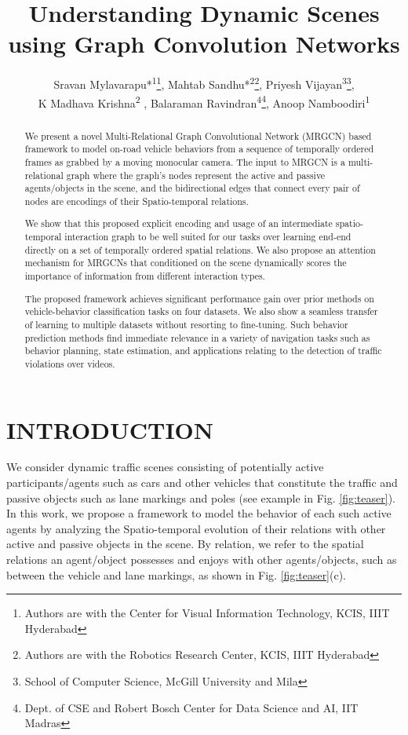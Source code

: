 \documentclass[letterpaper, 10 pt, conference]{ieeeconf}
\title{\LARGE \bf Understanding Dynamic Scenes using Graph Convolution Networks }
\author{ Sravan Mylavarapu*\textsuperscript{1}\thanks{Authors are with the Center for Visual Information Technology, KCIS, IIIT Hyderabad}, Mahtab Sandhu*\textsuperscript{2}\thanks{Authors are with the Robotics Research Center, KCIS, IIIT Hyderabad}, Priyesh Vijayan\textsuperscript{3}\thanks{ School of Computer Science, McGill University and Mila},\\ K Madhava Krishna\textsuperscript{2} , Balaraman Ravindran\textsuperscript{4}\thanks{ Dept. of CSE and Robert Bosch Center for Data Science and AI, IIT
Madras}, Anoop Namboodiri\textsuperscript{1}}
\begin{document}
\maketitle
\thispagestyle{empty}
\pagestyle{empty}


\begin{abstract}
We present a novel Multi-Relational Graph Convolutional Network (MRGCN) based framework to model on-road vehicle behaviors from a sequence of temporally ordered frames as grabbed by a moving monocular camera. The input to MRGCN is a multi-relational graph where the graph's nodes represent the active and passive agents/objects in the scene, and the bidirectional edges that connect every pair of nodes are encodings of their Spatio-temporal relations.

We show that this proposed explicit encoding and usage of an intermediate spatio-temporal interaction graph to be well suited for our tasks over learning end-end directly on a set of temporally ordered spatial relations. We also propose an attention mechanism for MRGCNs that conditioned on the scene dynamically scores the importance of information from different interaction types.

The proposed framework achieves significant performance gain over prior methods on vehicle-behavior classification tasks on four datasets. We also show a seamless transfer of learning to multiple datasets without resorting to fine-tuning. Such behavior prediction methods find immediate relevance in a variety of navigation tasks such as behavior planning, state estimation, and applications relating to the detection of traffic violations over videos.





\end{abstract}


\section{INTRODUCTION}

We consider dynamic traffic scenes consisting of potentially active participants/agents such as cars and other vehicles that constitute the traffic and passive objects such as lane markings and poles (see example in Fig. \ref{fig:teaser}). In this work, we propose a framework to model the behavior of each such active agents by analyzing the Spatio-temporal evolution of their relations with other active and passive objects in the scene. By relation, we refer to the spatial relations an agent/object possesses and enjoys with other agents/objects, such as between the vehicle and lane markings, as shown in Fig. \ref{fig:teaser}(c). 
\end{document}
